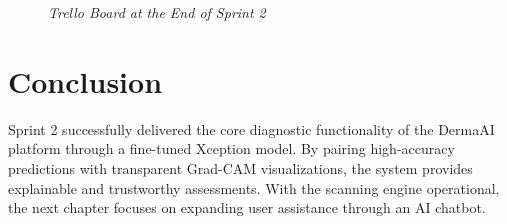 \begin{figure}[H]
	\centering
	\caption{\textit{Trello Board at the End of Sprint 2}}
	\label{fig:trello_sprint2}
\end{figure}

\section{Conclusion}
Sprint 2 successfully delivered the core diagnostic functionality of the DermaAI platform through a fine-tuned Xception model. By pairing high-accuracy predictions with transparent Grad-CAM visualizations, the system provides explainable and trustworthy assessments. With the scanning engine operational, the next chapter focuses on expanding user assistance through an AI chatbot.
